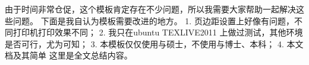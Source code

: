 

\begin{summary}
	
由于时间非常仓促，这个模板肯定存在不少问题，所以我需要大家帮助一起解决这
些问题。
下面是我自认为模板需要改进的地方。
1. 页边距设置上好像有问题，不同打印机打印效果不同；
2. 我只在ubuntu TEXLIVE2011 上做过测试，其他环境是否可行，尤为可知；
3. 本模板仅仅使用与硕士，不使用与博士、本科；
4. 本文档及其简单
这里是全文总结内容。

\end{summary}